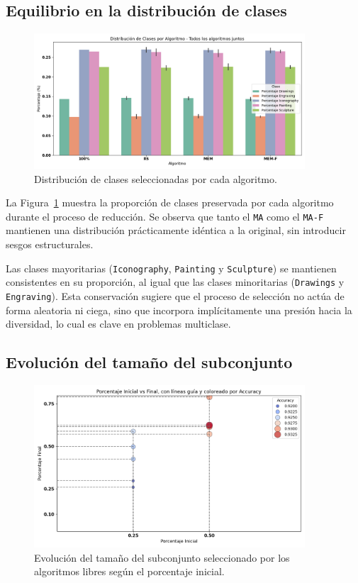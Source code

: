 \subsection{Equilibrio en la distribución de clases}
\begin{figure}[htp]
    \centering
    \includegraphics[width=0.9\textwidth]{imagenes/evaluaciones/painting/balance-de-clases-por-algoritmo}
    \caption{Distribución de clases seleccionadas por cada algoritmo.}
    \label{fig:balance_clases_painting}
\end{figure}

La Figura~\ref{fig:balance_clases_painting} muestra la proporción de clases preservada por cada algoritmo durante el proceso de reducción.
Se observa que tanto el \texttt{MA} como el \texttt{MA-F} mantienen una distribución prácticamente idéntica a la original,
sin introducir sesgos estructurales.

Las clases mayoritarias (\texttt{Iconography}, \texttt{Painting} y \texttt{Sculpture}) se mantienen consistentes en su proporción,
al igual que las clases minoritarias (\texttt{Drawings} y \texttt{Engraving}).
Esta conservación sugiere que el proceso de selección no actúa de forma aleatoria ni ciega,
sino que incorpora implícitamente una presión hacia la diversidad, lo cual es clave en problemas multiclase.

\subsection{Evolución del tamaño del subconjunto}
\begin{figure}[htp]
    \centering
    \includegraphics[width=0.9\textwidth]{imagenes/evaluaciones/painting/scatter-por-porcentaje}
    \caption{Evolución del tamaño del subconjunto seleccionado por los algoritmos libres según el porcentaje inicial.}
    \label{fig:evolucion_porcentaje_libre}
\end{figure}

